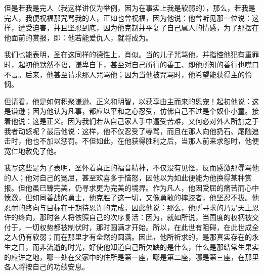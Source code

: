 但是若我是完人（我这样讲仅为举例，因为在事实上我是软弱的），那么，若我是完人，我便祝福那咒骂我的人，正如也曾祝福，因为他说：他曾听见那一位说：这样，遭受迫害，并且坚忍到底，因为他克制并平复了自己属人的情感，为了那摆在他面前的赏报，即：他若能爱仇人，就将成为。\par

我们也能表明，圣在这同样的德性上，肖似。当的儿子咒骂他，并指控他犯有重罪时，起初他默然不语，谦卑自下，甚至对自己所行的善工、即他所知的善行也噤口不言。后来，他甚至请求那人咒骂他；因为当他被咒骂时，他希望能获得主的怜悯。\par

但请看，他是如何积聚谦逊、正义和明智，以获享由主而来的恩宠！起初他说：这是谦逊；因为他认为凡事，都应以平和之心忍受，仿佛自己不过是个奴仆小童。接着他说：这是正义。因为我们若从自己家人手中遭受苦难，又何必对外人所加之于我者动怒呢？最后他说：这样，他不仅忍受了辱骂，而且在那人向他扔石、尾随追击时，他也不加以惩罚。不但如此，在他获得胜利之后，当那人前来求恕时，他便宽仁地赦免了他。\par

我写这些是为了表明，圣怀着真正的福音精神，不仅没有见怪，反而感激那辱骂他的人；他对自己的冤屈，甚至欢喜多于恼怒，因他以为如此便能为他换得某种赏报。但他虽已臻完美，仍寻求更为完美的境界。作为凡人，他因受屈的痛苦而心中愤激，但如同善战的勇士，他克胜了这一切，又像勇敢的摔跤者，他坚忍不拔。他忍耐的终向与目标在于期待恩许的完成，因此他说：那么，他所寻求的乃是天上恩许的终向，那时各人将依照自己的次序复活：因为，就如所说，当国度的权柄被交付于，一切权势都被制伏时，那时圆满才开始。所以，在此世有阻碍，在此世成全之人仍有软弱；而在那里才有全然的圆满。因此，他所祈求的，是那真实存在的永生之日，而非流逝的时光，好使他知道自己所欠缺的是什么，什么是那结常生果实的应许之地，哪一处在父家中的住所是第一座，哪是第二座，哪是第三座，在那里各人将按自己的功绩安息。\par

